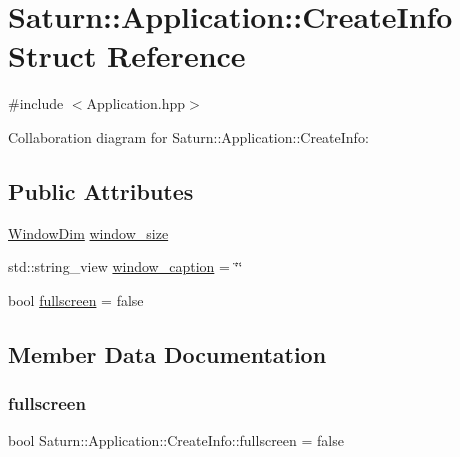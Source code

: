 \hypertarget{struct_saturn_1_1_application_1_1_create_info}{}\section{Saturn\+:\+:Application\+:\+:Create\+Info Struct Reference}
\label{struct_saturn_1_1_application_1_1_create_info}


{\ttfamily \#include $<$Application.\+hpp$>$}



Collaboration diagram for Saturn\+:\+:Application\+:\+:Create\+Info\+:
\subsection*{Public Attributes}
\begin{DoxyCompactItemize}
\item 
\mbox{\hyperlink{namespace_saturn_a606451fdad804aef3b4f56f6805900f2}{Window\+Dim}} \mbox{\hyperlink{struct_saturn_1_1_application_1_1_create_info_ac25cc9dad843c1cb7e803fd25934ad6d}{window\+\_\+size}}
\item 
std\+::string\+\_\+view \mbox{\hyperlink{struct_saturn_1_1_application_1_1_create_info_a7dcda42e5207cc685f69c574ca3e3c14}{window\+\_\+caption}} = \char`\"{}\char`\"{}
\item 
bool \mbox{\hyperlink{struct_saturn_1_1_application_1_1_create_info_a16231e93e75c64e8740be27ed257dd92}{fullscreen}} = false
\end{DoxyCompactItemize}


\subsection{Member Data Documentation}
\mbox{\label{struct_saturn_1_1_application_1_1_create_info_a16231e93e75c64e8740be27ed257dd92}} 
\subsubsection{\texorpdfstring{fullscreen}{fullscreen}}
{\footnotesize\ttfamily bool Saturn\+::\+Application\+::\+Create\+Info\+::fullscreen = false}

